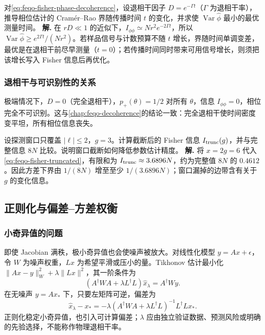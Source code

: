 \par
\begin{workedexample}
对\cref{eq:feqo-fisher-phase-decoherence}，设退相干因子 $D=e^{-\Gamma t}$（$\Gamma$ 为退相干率），推导相位估计的 Cram\'er--Rao 界随传播时间 $t$ 的变化，并求使 $\operatorname{Var}\hat\phi$ 最小的最优测量时间。
\textbf{解.} 在 $rD\ll1$ 的近似下，$I_{\phi\phi}\simeq Nr^2e^{-2\Gamma t}$，所以 $\operatorname{Var}\hat\phi\ge e^{2\Gamma t}/(Nr^2)$。若样品信号与计数预算不随 $t$ 增长，界随时间单调变差，最优是在退相干前尽早测量（$t=0$）；若传播时间同时带来可用信号增长，则须把该增长写入 Fisher 信息后再优化。
\end{workedexample}
\par
\subsubsection{退相干与可识别性的关系}

极端情况下，$D=0$（完全退相干），$p_+(\theta)=1/2$ 对所有 $\theta$，信息 $I_{\phi\phi}=0$，相位完全不可识别。这与\cref{chap:feqo-decoherence}的结论一致：完全退相干使时间密度变平坦，所有相位信息丧失。


\par
\begin{workedexample}
设探测窗口只覆盖 $|\ell|\leq 2$，$g=3$。计算截断后的 Fisher 信息 $I_{\rm trunc}(g)$，并与完整信息 $8N$ 比较。说明窗口截断如何降低参数估计精度。
\textbf{解.} 将 $x=2g=6$ 代入\cref{eq:feqo-fisher-truncated}，有限和为 $I_{\rm trunc}\approx3.6896N$，约为完整值 $8N$ 的 $0.4612$。因此方差下界由 $1/(8N)$ 增至至少 $1/(3.6896N)$；窗口漏掉的边带含有关于 $g$ 的变化信息。
\end{workedexample}
\par
\subsection{正则化与偏差--方差权衡}

\subsubsection{小奇异值的问题}

即使 Jacobian 满秩，极小奇异值也会使噪声被放大。对线性化模型 $y=Ax+\epsilon$，令 $W$ 为噪声权重，$Lx$ 为希望平滑或压小的量。Tikhonov 估计最小化 $\|Ax-y\|_W^2+\lambda\|Lx\|^2$，其一阶条件为
\begin{equation}
(A^\dagger WA+\lambda L^\dagger L)\widehat{x}_\lambda=A^\dagger Wy.
\label{eq:feqo-tikhonov}
\end{equation}
在无噪声 $y=Ax_*$ 下，只要左矩阵可逆，偏差为
\begin{equation}
\widehat{x}_\lambda-x_*=-\lambda(A^\dagger WA+\lambda L^\dagger L)^{-1}L^\dagger Lx_*.
\label{eq:feqo-tikhonov-bias}
\end{equation}
正则化稳定小奇异值，也引入可计算偏差；$\lambda$ 应由独立验证数据、预测风险或明确的先验选择，不能称作物理退相干率。

